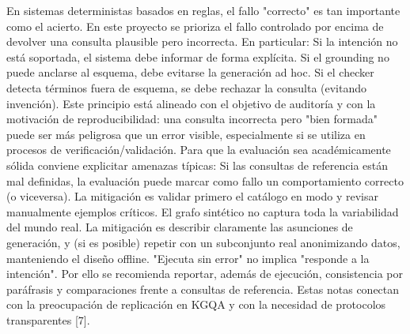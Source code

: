 {}\markdownRendererInterblockSeparator
{}En sistemas deterministas basados en reglas, el fallo "correcto" es tan importante como el acierto. En este proyecto se prioriza el fallo controlado por encima de devolver una consulta plausible pero incorrecta. En particular:\markdownRendererInterblockSeparator
{}\markdownRendererUlBeginTight
\markdownRendererUlItem Si la intención no está soportada, el sistema debe informar de forma explícita.\markdownRendererUlItemEnd 
\markdownRendererUlItem Si el grounding no puede anclarse al esquema, debe evitarse la generación ad hoc.\markdownRendererUlItemEnd 
\markdownRendererUlItem Si el checker detecta términos fuera de esquema, se debe rechazar la consulta (evitando invención).\markdownRendererUlItemEnd 
\markdownRendererUlEndTight \markdownRendererInterblockSeparator
{}Este principio está alineado con el objetivo de auditoría y con la motivación de reproducibilidad: una consulta incorrecta pero "bien formada" puede ser más peligrosa que un error visible, especialmente si se utiliza en procesos de verificación/validación.\markdownRendererInterblockSeparator
{}\markdownRendererInterblockSeparator
{}Para que la evaluación sea académicamente sólida conviene explicitar amenazas típicas:\markdownRendererInterblockSeparator
{}\markdownRendererUlBeginTight
\markdownRendererUlItem {} Si las consultas de referencia están mal definidas, la evaluación puede marcar como fallo un comportamiento correcto (o viceversa). La mitigación es validar primero el catálogo en modo  y revisar manualmente ejemplos críticos.\markdownRendererUlItemEnd 
\markdownRendererUlItem {} El grafo sintético no captura toda la variabilidad del mundo real. La mitigación es describir claramente las asunciones de generación, y (si es posible) repetir con un subconjunto real anonimizando datos, manteniendo el diseño offline.\markdownRendererUlItemEnd 
\markdownRendererUlItem {} "Ejecuta sin error" no implica "responde a la intención". Por ello se recomienda reportar, además de ejecución, consistencia por paráfrasis y comparaciones frente a consultas de referencia.\markdownRendererUlItemEnd 
\markdownRendererUlEndTight \markdownRendererInterblockSeparator
{}Estas notas conectan con la preocupación de replicación en KGQA y con la necesidad de protocolos transparentes [7].\markdownRendererInterblockSeparator
